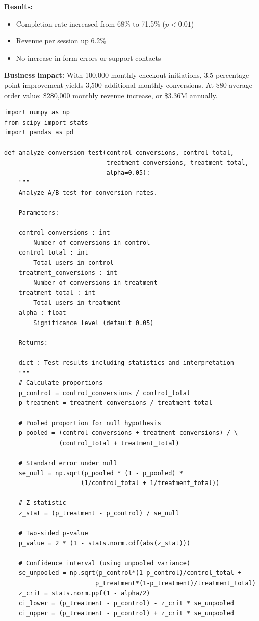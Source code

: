 \textbf{Results:}
\begin{itemize}
    \item Completion rate increased from 68\% to 71.5\% ($p < 0.01$)
    \item Revenue per session up 6.2\%
    \item No increase in form errors or support contacts
\end{itemize}

\textbf{Business impact:} With 100,000 monthly checkout initiations, 3.5 percentage point improvement yields 3,500 additional monthly conversions. At \$80 average order value: \$280,000 monthly revenue increase, or \$3.36M annually.

\lstset{language=Python, caption=Basic A/B Test Analysis for Conversion Rates}
\begin{lstlisting}
import numpy as np
from scipy import stats
import pandas as pd

def analyze_conversion_test(control_conversions, control_total,
                            treatment_conversions, treatment_total,
                            alpha=0.05):
    """
    Analyze A/B test for conversion rates.

    Parameters:
    -----------
    control_conversions : int
        Number of conversions in control
    control_total : int
        Total users in control
    treatment_conversions : int
        Number of conversions in treatment
    treatment_total : int
        Total users in treatment
    alpha : float
        Significance level (default 0.05)

    Returns:
    --------
    dict : Test results including statistics and interpretation
    """
    # Calculate proportions
    p_control = control_conversions / control_total
    p_treatment = treatment_conversions / treatment_total

    # Pooled proportion for null hypothesis
    p_pooled = (control_conversions + treatment_conversions) / \
               (control_total + treatment_total)

    # Standard error under null
    se_null = np.sqrt(p_pooled * (1 - p_pooled) *
                     (1/control_total + 1/treatment_total))

    # Z-statistic
    z_stat = (p_treatment - p_control) / se_null

    # Two-sided p-value
    p_value = 2 * (1 - stats.norm.cdf(abs(z_stat)))

    # Confidence interval (using unpooled variance)
    se_unpooled = np.sqrt(p_control*(1-p_control)/control_total +
                         p_treatment*(1-p_treatment)/treatment_total)
    z_crit = stats.norm.ppf(1 - alpha/2)
    ci_lower = (p_treatment - p_control) - z_crit * se_unpooled
    ci_upper = (p_treatment - p_control) + z_crit * se_unpooled


\end{lstlisting}
